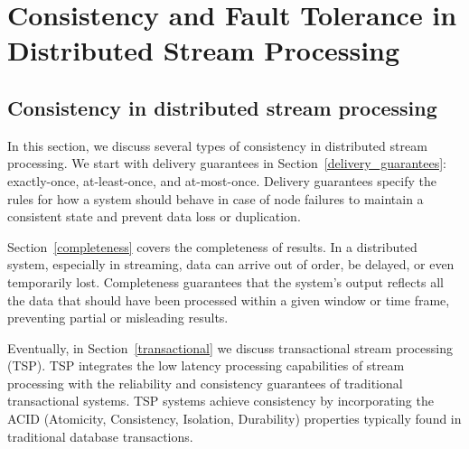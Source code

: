 \chapter{Consistency and Fault Tolerance in Distributed Stream Processing}
\label{thesis-chapter-literature-review}

\section{Consistency in distributed stream processing}
\label{consistency_overview}

In this section, we discuss several types of consistency in distributed stream processing. We start with delivery guarantees in Section~\ref{delivery_guarantees}: exactly-once, at-least-once, and at-most-once. Delivery guarantees specify the rules for how a system should behave in case of node failures to maintain a consistent state and prevent data loss or duplication.

Section~\ref{completeness} covers the completeness of results.  In a distributed system, especially in streaming, data can arrive out of order, be delayed, or even temporarily lost. Completeness guarantees that the system's output reflects all the data that should have been processed within a given window or time frame, preventing partial or misleading results.

Eventually, in Section~\ref{transactional} we discuss transactional stream processing (TSP). TSP integrates the low latency processing capabilities of stream processing with the reliability and consistency guarantees of traditional transactional systems. TSP systems achieve consistency by incorporating the ACID (Atomicity, Consistency, Isolation, Durability) properties typically found in traditional database transactions.


